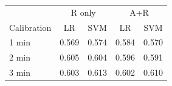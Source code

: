 \begin{tabular}{@{}lcccc@{}}
\toprule
& \multicolumn{2}{c}{R only} & \multicolumn{2}{c}{A+R} \\
Calibration & LR & SVM & LR & SVM \\
\midrule
1 min & 0.569 & 0.574 & 0.584 & 0.570 \\
2 min & 0.605 & 0.604 & 0.596 & 0.591 \\
3 min & 0.603 & 0.613 & 0.602 & 0.610 \\
\bottomrule
\end{tabular}
